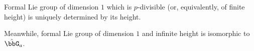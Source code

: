 \begin{corollary}
	Formal Lie group of dimension $1$ which is $p$-divisible (or, equivalently, of finite height) is uniquely determined by its height.
\end{corollary}

Meanwhile, formal Lie group of dimension $1$ and infinite height is isomorphic to $\hat{\bbG}_a$.






































